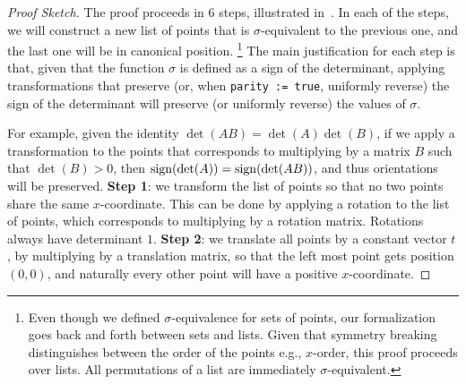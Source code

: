 \begin{proof}[Proof Sketch]
The proof proceeds in 6 steps, illustrated in~.
In each of the steps, we will construct a new list of points that is $\sigma$-equivalent to the previous one,
and the last one will be in canonical position.
\footnote{Even though we defined $\sigma$-equivalence for sets of points,
our formalization goes back and forth between sets and lists.
Given that symmetry breaking distinguishes between the order of the points
e.g., $x$-order, this proof proceeds over lists.
All permutations of a list are immediately $\sigma$-equivalent.}
The main justification for each step is that,
given that the function $\sigma$ is defined as a sign of the determinant,
applying transformations that preserve (or, when \lstinline|parity := true|, uniformly reverse)
the sign of the determinant will preserve (or uniformly reverse) the values of $\sigma$.

For example, given the identity $\det(AB) = \det(A)\det(B)$,
if we apply a transformation to the points that corresponds to multiplying by a matrix $B$ such that $\det(B) > 0$,
then $\operatorname{sign}(\det(A)) = \operatorname{sign}(\det(AB))$, and thus orientations will be preserved.
\textbf{Step 1}: we transform the list of points so that no two points share the same $x$-coordinate.
This can be done by applying a rotation to the list of points, which corresponds to multiplying by a rotation matrix.
Rotations always have determinant $1$.
\textbf{Step 2}: we translate all points by a constant vector $t$, by multiplying by a translation matrix,
so that the left most point gets position $(0, 0)$, and naturally every other point will have a positive $x$-coordinate.


\end{proof}

